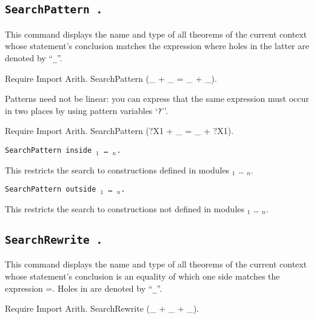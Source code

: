 \subsection[\tt SearchPattern {\term}.]{\tt SearchPattern {\term}.}

This command displays the name and type of all theorems of the current
context whose statement's conclusion matches the expression {\term}
where holes in the latter are denoted by ``{\texttt \_}''.

\begin{coq_example}
Require Import Arith.
SearchPattern (_ + _ = _ + _).
\end{coq_example}

Patterns need not be linear: you can express that the same expression
must occur in two places by using pattern variables `{\texttt
?{\ident}}''.

\begin{coq_example}
Require Import Arith.
SearchPattern (?X1 + _ = _ + ?X1).
\end{coq_example}

\begin{Variants}
\item {\tt SearchPattern {\term} inside
{\module$_1$} \ldots{} {\module$_n$}.}

This restricts the search to constructions defined in modules
{\module$_1$} \ldots{} {\module$_n$}.

\item {\tt SearchPattern {\term} outside {\module$_1$} \ldots{} {\module$_n$}.}

This restricts the search to constructions not defined in modules
{\module$_1$} \ldots{} {\module$_n$}.

\end{Variants}

\subsection[\tt SearchRewrite {\term}.]{\tt SearchRewrite {\term}.}

This command displays the name and type of all theorems of the current
context whose statement's conclusion is an equality of which one side matches
the expression {\term =}. Holes in {\term} are denoted by ``{\texttt \_}''.

\begin{coq_example}
Require Import Arith.
SearchRewrite (_ + _ + _).
\end{coq_example}

